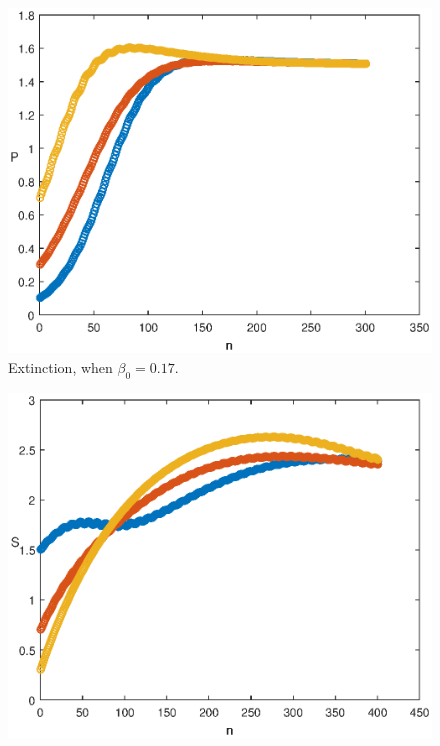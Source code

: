 \documentclass[reqno]{amsart}
\begin{document}
{{\begin{figure}
\begin{minipage}[b]{.32\linewidth}
  \end{minipage}
  \begin{minipage}[b]{.32\linewidth}
        \includegraphics[width=\linewidth]{Predator_EXT_NZT.eps}
  \end{minipage}
    \caption{Extinction, when $\beta_0=0.17$.}
      \label{fig-no-predation-on-uninfected-PER-1}
\end{figure}
\begin{figure}
  \begin{minipage}[b]{.32\linewidth}
    \includegraphics[width=\linewidth]{Susceptible_PERS_NZT.eps}

\end{minipage}
\end{figure}}}
\end{document}
